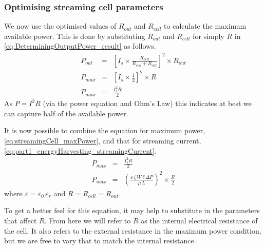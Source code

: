 

    \subsubsection*{Optimising streaming cell parameters}


      We now use the optimised values of $R_{out}$ and $R_{cell}$ to calculate the maximum available power.
      This is done by substituting $R_{out}$ and $R_{cell}$ for simply $R$ in \eqref{eq:DeterminingOutputPower_result} as follows.
      \begin{eqnarray}
          P_{out} & = & \left[I_{s}\times\frac{R_{cell}}{R_{cell}+R_{out}}\right]^{2}\times R_{out}\nonumber \\
          P_{max} & = & \left[I_{s}\times\frac{1}{2}\right]^{2}\times R\nonumber \\
          P_{max} & = & \frac{I_{s}^{2}R}{2}
          \label{eq:streamingCell_maxPower}
      \end{eqnarray}
      As $P=I^{2}R$ (via the power equation and Ohm's Law) this indicates at best we can capture half of the available power.

      It is now possible to combine the equation for maximum power, \eqref{eq:streamingCell_maxPower}, and that for streaming current, \eqref{eq:part1_energyHarvesting_streamingCurrent}.
      \begin{eqnarray}
          P_{max} & = & \frac{I_{s}^{2}R}{2}\nonumber \\
          P_{max} & = & \left(\frac{\varepsilon\,\zeta\,W\,\delta\,\Delta P}{\mu\,L}\right)^{2}\times\frac{R}{2}
          \label{eq:streamingCell_maxPower_substituted}
      \end{eqnarray}
      where $\varepsilon=\varepsilon_{0}\,\varepsilon_{r}$ and $R=R_{cell}=R_{out}$.

      To get a better feel for this equation, it may help to substitute in the parameters that affect $R$.
      From here we will refer to $R$ as the internal electrical resistance of the cell.
      It also refers to the external resistance in the maximum power condition, but we are free to vary that to match the internal resistance.

